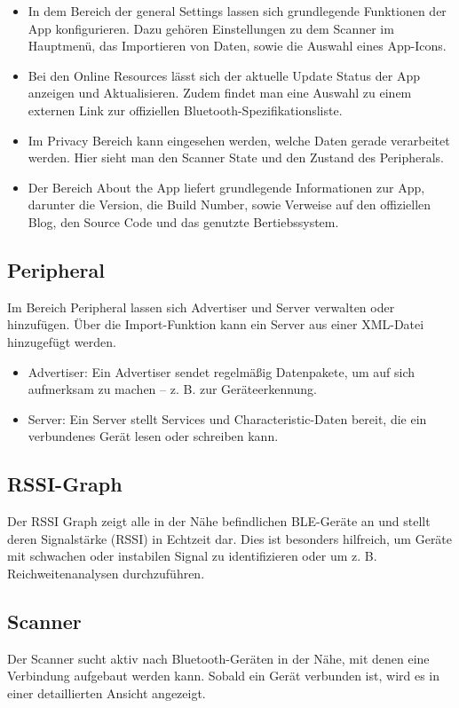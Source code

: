 \begin{itemize}
    \item In dem Bereich der general Settings lassen sich grundlegende Funktionen der App konfigurieren. Dazu gehören Einstellungen zu dem Scanner im Hauptmenü, das Importieren von Daten, sowie die Auswahl eines App-Icons.
    \item Bei den Online Resources lässt sich der aktuelle Update Status der App anzeigen und Aktualisieren. Zudem findet man eine Auswahl zu einem externen Link zur offiziellen Bluetooth-Spezifikationsliste.
    \item Im Privacy Bereich kann eingesehen werden, welche Daten gerade verarbeitet werden. Hier sieht man den Scanner State und den Zustand des Peripherals.
    \item Der Bereich About the App liefert grundlegende Informationen zur App, darunter die Version, die Build Number, sowie Verweise auf den offiziellen Blog, den Source Code und das genutzte Bertiebssystem.
\end{itemize}

\subsection{Peripheral}
Im Bereich Peripheral lassen sich Advertiser und Server verwalten oder hinzufügen. Über die Import-Funktion kann ein Server aus einer XML-Datei hinzugefügt werden.

\begin{itemize}
    \item Advertiser: Ein Advertiser sendet regelmäßig Datenpakete, um auf sich aufmerksam zu machen – z. B. zur Geräteerkennung.
    \item Server: Ein Server stellt Services und Characteristic-Daten bereit, die ein verbundenes Gerät lesen oder schreiben kann.
\end{itemize}

\subsection{RSSI-Graph}
Der RSSI Graph zeigt alle in der Nähe befindlichen BLE-Geräte an und stellt deren Signalstärke (RSSI) in Echtzeit dar. Dies ist besonders hilfreich, um Geräte mit schwachen oder instabilen Signal zu identifizieren oder um z. B. Reichweitenanalysen durchzuführen.

\subsection{Scanner}
Der Scanner sucht aktiv nach Bluetooth-Geräten in der Nähe, mit denen eine Verbindung aufgebaut werden kann.
Sobald ein Gerät verbunden ist, wird es in einer detaillierten Ansicht angezeigt.

